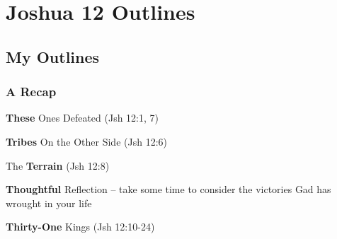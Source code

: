 \section{Joshua 12 Outlines}

\subsection{My Outlines}

\subsubsection{A Recap}
\begin{compactenum}[I.]

	\item \textbf{These} Ones Defeated    (Jsh 12:1, 7) 
	\item \textbf{Tribes} On the Other Side    (Jsh 12:6) 
	\item The \textbf{Terrain}    (Jsh 12:8) 
	\item \textbf{Thoughtful} Reflection -- take some time to consider the victories Gad has wrought in your life %
	\item \textbf{Thirty-One} Kings    (Jsh 12:10-24) 

\end{compactenum}